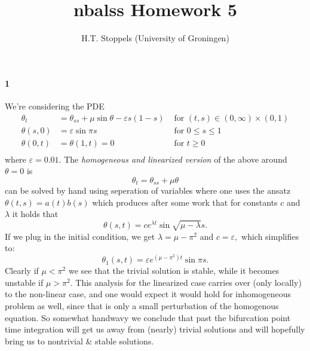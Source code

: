 \documentclass[a4paper]{article}
\author{H.T. Stoppels (University of Groningen)}
\title{{\sc nbalss} Homework 5}
\begin{document}
  \maketitle 

  \paragraph{1} We're considering the PDE
  \begin{align*}
    \theta_t &= \theta_{ss} + \mu \sin \theta - \varepsilon s(1 - s) & \text{ for } (t, s) \in (0, \infty) \times (0, 1) \\
    \theta(s, 0) &= \varepsilon \sin \pi s & \text{ for } 0 \le s \le 1 \\
    \theta(0, t) &= \theta(1, t) = 0  & \text{ for } t \ge 0\\
  \end{align*}
  where $\varepsilon = 0.01.$ The \emph{homogeneous and linearized version} of the above around $\theta = 0$ is $$\theta_t = \theta_{ss} + \mu \theta$$ can be solved by hand using seperation of variables where one uses the ansatz $\theta(t, s) = a(t)b(s)$ which produces after some work that for constants $c$ and $\lambda$ it holds that $$\theta(s, t) = c e^{\lambda t} \sin \sqrt{\mu - \lambda}s.$$ If we plug in the initial condition, we get $\lambda = \mu - \pi^2$ and $c = \varepsilon,$ which simplifies to: $$\theta_1(s,t) = \varepsilon e^{(\mu - \pi^2)t}\sin \pi s.$$ Clearly if $\mu < \pi^2$ we see that the trivial solution is stable, while it becomes unstable if $\mu > \pi^2.$ This analysis for the linearized case carries over (only locally) to the non-linear case, and one would expect it would hold for inhomogeneous problem as well, since that is only a small perturbation of the homogenous equation. So somewhat handwavy we conclude that past the bifurcation point time integration will get us away from (nearly) trivial solutions and will hopefully bring us to nontrivial \& stable solutions.
\end{document}
